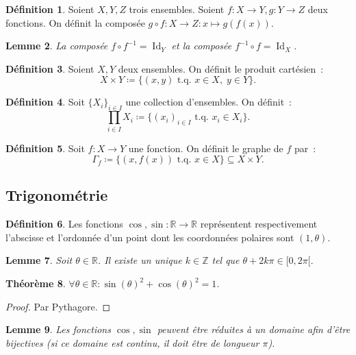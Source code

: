 \documentclass{article}
\DeclareMathOperator{\Id}{Id}
\newcommand{\Z}{\mathbb Z}
\newcommand{\R}{\mathbb R}
\newcommand{\tq}{\textrm{ t.q. }}
\newtheorem{thm}{Théorème}[section]
\newtheorem{lem}[thm]{Lemme}
\theoremstyle{definition}
\newtheorem{déf}[thm]{Définition}
\theoremstyle{remark}
\begin{document}
		\begin{déf} Soient $X, Y, Z$ trois ensembles. Soient $f : X \to Y, g : Y \to Z$ deux fonctions. On définit la composée $g \circ f : X \to Z : x \mapsto g(f(x))$.
		\end{déf}

		\begin{lem} La composée $f \circ f^{-1} = \Id_Y$ et la composée $f^{-1} \circ f = \Id_X$. \end{lem}

		\begin{déf} Soient $X, Y$ deux ensembles. On définit le produit cartésien~: \[X \times Y \coloneqq \{(x, y) \tq x \in X,\;y\in Y\}.\] \end{déf}

		\begin{déf} Soit $\{X_i\}_{i \in I}$ une collection d'ensembles. On définit~: \[\prod_{i \in I} X_i \coloneqq \{(x_i)_{i \in I} \tq x_i \in X_i\}.\] \end{déf}

		\begin{déf} Soit $f : X \to Y$ une fonction. On définit le graphe de $f$ par~: \[\Gamma_f \coloneqq \{(x, f(x)) \tq x \in X\} \subseteq X \times Y.\] \end{déf}

	\subsection{Trigonométrie}
		\begin{déf} Les fonctions $\cos, \sin : \R \to \R$ représentent respectivement l'abscisse et l'ordonnée d'un point dont les coordonnées polaires sont
		$(1, \theta)$. \end{déf}

		\begin{lem} Soit $\theta \in \R$. Il existe un unique $k \in \Z$ tel que $\theta + 2k\pi \in [0, 2\pi[.$\end{lem}

		\begin{thm} $\forall \theta \in \R : \sin(\theta)^2 + \cos(\theta)^2 = 1$. \end{thm}

		\begin{proof} Par Pythagore. \end{proof}

		\begin{lem} Les fonctions $\cos, \sin$ peuvent être réduites à un domaine afin d'être bijectives (si ce domaine est continu, il doit être de longueur $\pi$).
		\end{lem}
\end{document}
